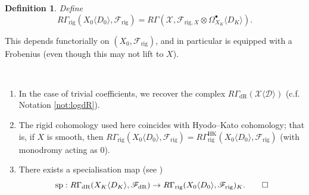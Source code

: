 \documentclass[cjm]{ipart}
\theoremstyle{plain}
\newtheorem{definition}[theorem]{Definition}
\theoremstyle{remark}
\DeclareMathOperator{\HK}{HK}
\newcommand{\cD}{\mathcal{D}}
\newcommand{\cX}{\mathcal{X}}
\newcommand{\dR}{\mathrm{dR}}
\newcommand{\rig}{\mathrm{rig}}
\newcommand{\sF}{\mathscr{F}}
\numberwithin{equation}{subsection}
\begin{document}
  \begin{definition}
   Define
   \[ R\Gamma_{\rig}(X_0\langle D_0\rangle,\sF_{\rig})= R\Gamma(\cX,\sF_{\rig, X} \otimes\Omega^\bullet_{X_K}\langle D_K\rangle).\]
 \end{definition}

 This depends functorially on $(X_0, \sF_{\rig})$, and in particular is equipped with a Frobenius (even though this may not lift to $X$).

 \begin{note}\label{note:proprig}~
  \begin{enumerate}
   \item In the case of trivial coefficients, we recover the complex $R\Gamma_{\dR}(\cX\langle \cD \rangle)$ (c.f. Notation \ref{not:logdR}).
   \item The rigid cohomology used here coincides with Hyodo--Kato cohomology; that is, if $X$ is smooth, then $R\Gamma_{\rig}(X_0\langle D_0\rangle,\sF_{\rig})=R\Gamma^{\HK}_{\rig}(X_0\langle D_0\rangle,\sF_{\rig})$ (with monodromy acting as 0).
   \item There exists a specialisation map (see \cite{baldassarriberthelot04})
  \[  \operatorname{sp}: R\Gamma_{\dR}(X_K\langle D_K\rangle,\sF_{\dR})\to R\Gamma_{\rig}(X_0\langle D_0\rangle,\sF_{\rig})_K.\qedhere \]
  \end{enumerate}
 \end{note}

\end{document}

